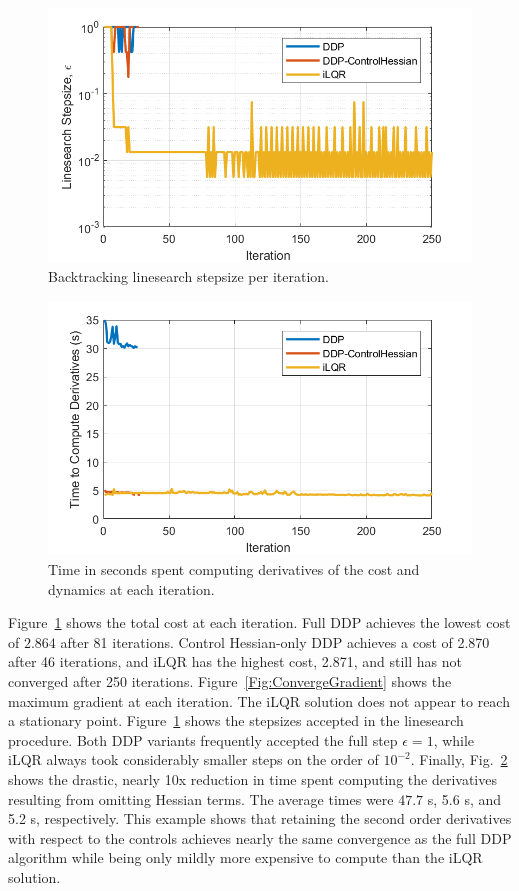 \begin{figure}[h!]
	\centering
	\includegraphics[width=1\textwidth]{Images/Convergence/alpha}
	\caption{Backtracking linesearch stepsize per iteration.}
	\label{Fig:ConvergeStepsize}
\end{figure}
\begin{figure}[h!]
	\centering
	\includegraphics[width=1\textwidth]{Images/Convergence/time_derivs}
	\caption{Time in seconds spent computing derivatives of the cost and dynamics at each iteration.}
	\label{Fig:ConvergeTime}
\end{figure}
Figure~\ref{Fig:ConvergeStepsize} shows the total cost at each iteration. Full DDP achieves the lowest cost of $2.864$ after 81 iterations. Control Hessian-only DDP achieves a cost of 2.870 after 46 iterations, and iLQR has the highest cost, 2.871, and still has not converged after 250 iterations. Figure~\ref{Fig:ConvergeGradient} shows the maximum gradient at each iteration. The iLQR solution does not appear to reach a stationary point. 
Figure~\ref{Fig:ConvergeStepsize} shows the stepsizes accepted in the linesearch procedure. Both DDP variants frequently accepted the full step $\epsilon=1$, while iLQR always took considerably smaller steps on the order of $ 10^{-2} $. Finally, Fig.~\ref{Fig:ConvergeTime} shows the drastic, nearly 10x reduction in time spent computing the derivatives resulting from omitting Hessian terms. The average times were $47.7$ s, 5.6 s, and 5.2 s, respectively. 
This example shows that retaining the second order derivatives with respect to the controls achieves nearly the same convergence as the full DDP algorithm while being only mildly more expensive to compute than the iLQR solution. 

